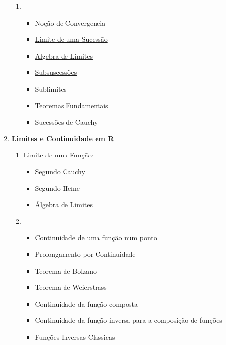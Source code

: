 \documentclass{article}
\begin{document}
\begin{multicols}{2}
\begin{enumerate}[label=\arabic*.]
\begin{enumerate}
		\item \
		\begin{itemize}[left = -9mm]
			
			\item Noção de Convergencia
			
			\item \hyperref[sucessao limitada]
				 {Limite de uma Sucessão}
				 
			\item \hyperref[algebra de limites]
				 {Algebra de Limites}
				 
			\item \hyperref[subsucessoes]{Subsuscessões}
			\item Sublimites
			\item Teoremas Fundamentais
			\item \hyperref[sucessao de cauchy]
				 {Sucessões de Cauchy}
			
		\end{itemize}
	
	\end{enumerate}
	
	\vspace{3mm}
	
	\item {\bfseries
		Limites e Continuidade em R
	}
	\begin{enumerate}
	[label=\theenumi\arabic*., left = -5.4mm]
		
		\item Limite de uma Função:
		\begin{itemize}[left = -9mm]
		
			\item Segundo Cauchy
			\item Segundo Heine
			\item Álgebra de Limites
		
		\end{itemize}
		
		\item \
		\begin{itemize}[left = -9mm]
		
			\item Continuidade de uma função num ponto
			\item Prolongamento por Continuidade
			\item Teorema de Bolzano
			\item Teorema de Weierstrass
			\item Continuidade da função composta
			\item Continuidade da função inversa
				 para a composição de funções
			\item Funções Inversas Clássicas
		\end{itemize}
		

\end{enumerate}
\end{enumerate}
\end{multicols}
\end{document}
